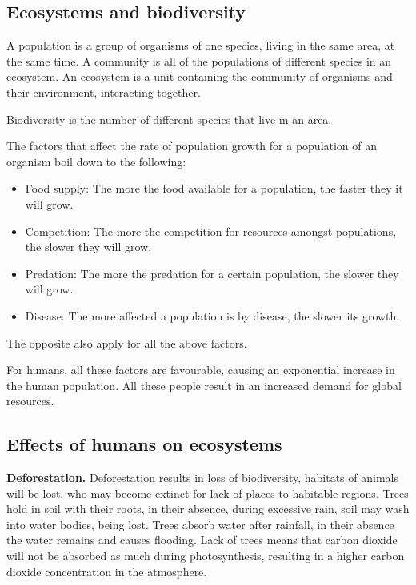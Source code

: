\subsection{Ecosystems and biodiversity}

A population is a group of organisms of one species, living in the same area, at the same time.
A community is all of the populations of different species in an ecosystem. An ecosystem is a unit
containing the community of organisms and their environment, interacting together.

Biodiversity is the number of different species that live in an area.

The factors that affect the rate of population growth for a population of an organism boil down to
the following:
\begin{itemize}
	\item Food supply: The more the food available for a population, the faster they it will grow.
	\item Competition: The more the competition for resources amongst populations, the slower they
		will grow.
	\item Predation: The more the predation for a certain population, the slower they will grow.
	\item Disease: The more affected a population is by disease, the slower its growth.
\end{itemize}
The opposite also apply for all the above factors.

For humans, all these factors are favourable, causing an exponential increase in the human 
population. All these people result in an increased demand for global resources.

\subsection{Effects of humans on ecosystems}

\textbf{Deforestation.} 
Deforestation results in loss of biodiversity, habitats of animals will be lost, who may become
extinct for lack of places to habitable regions. Trees hold in soil with their roots, in their
absence, during excessive rain, soil may wash into water bodies, being lost. Trees absorb water
after rainfall, in their absence the water remains and causes flooding. Lack of trees means that
carbon dioxide will not be absorbed as much during photosynthesis, resulting in a higher carbon
dioxide concentration in the atmosphere.
